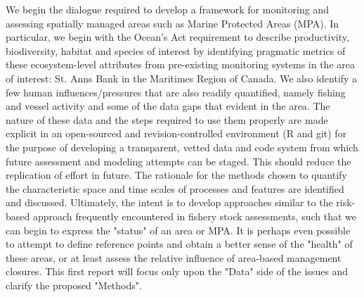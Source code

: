 \documentclass[letterpaper,portrait,11pt]{scrartcl}
\numberwithin{equation}{section}    %
\numberwithin{figure}{section}    %
\numberwithin{table}{section}       %
\begin{document}
We begin the dialogue required to develop a framework for monitoring and assessing spatially managed areas such as Marine Protected Areas (MPA). In particular, we begin with the Ocean's Act requirement to describe productivity, biodiversity, habitat and species of interest by identifying pragmatic metrics of these ecosystem-level attributes from pre-existing monitoring systems in the area of interest: St. Anns Bank in the Maritimes Region of Canada. We also identify a few human influences/pressures that are also readily quantified, namely fishing and vessel activity and some of the data gaps that evident in the area. The nature of these data and the steps required to use them properly are made explicit in an open-sourced and revision-controlled environment (R and git) for the purpose of developing a transparent, vetted data and code system from which future assessment and modeling attempts can be staged. This should reduce the replication of effort in future. The rationale for the methods chosen to quantify the characteristic space and time scales of processes and features are identified and discussed. Ultimately, the intent is to develop approaches similar to the risk-based approach frequently encountered in fishery stock assessments, such that we can begin to express the "status" of an area or MPA. It is perhaps even possible to attempt to define reference points and obtain a better sense of the "health" of these areas, or at least assess the relative influence of area-based management closures. This first report will focus only upon the "Data" side of the issues and clarify the proposed "Methods".









%
%

\setlength{\parskip}{12 pt} %
\setlength{\parindent}{0cm}
\setlength{\floatsep}{2cm}
\setcounter{tocdepth}{2} %
\setcounter{secnumdepth}{3} %

\renewcommand{\contentsname}{Table of contents}
\newpage
\clearpage                       %
{                                %
  \pagestyle{empty}              %

  \tableofcontents
}
\end{document}
